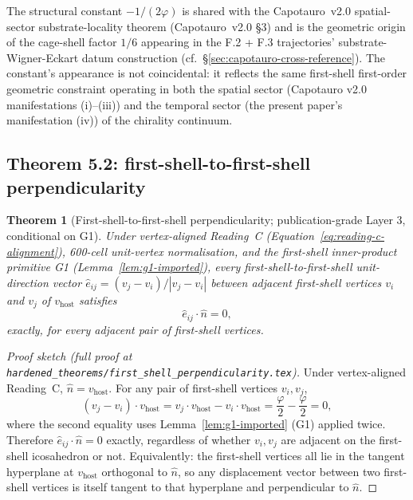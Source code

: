 \documentclass[11pt,letterpaper]{article}
\newtheorem{theorem}{Theorem}[section]
\newcommand{\phig}{\varphi}
\newcommand{\vhost}{v_{\text{host}}}
\begin{document}
The structural constant $-1/(2\phig)$ is shared with the Capotauro~v2.0 spatial-sector substrate-locality theorem (Capotauro~v2.0 \S3) and is the geometric origin of the cage-shell factor $1/6$ appearing in the F.2 + F.3 trajectories' substrate-Wigner-Eckart datum construction (cf.\ \S\ref{sec:capotauro-cross-reference}). The constant's appearance is not coincidental: it reflects the same first-shell first-order geometric constraint operating in both the spatial sector (Capotauro v2.0 manifestations (i)--(iii)) and the temporal sector (the present paper's manifestation (iv)) of the chirality continuum.

\subsection{Theorem 5.2: first-shell-to-first-shell perpendicularity}
\label{sec:first-shell-perpendicularity}

\begin{theorem}[First-shell-to-first-shell perpendicularity; publication-grade Layer 3, conditional on G1]
\label{thm:first-shell-perpendicularity}
Under vertex-aligned Reading~C (Equation~\eqref{eq:reading-c-alignment}), 600-cell unit-vertex normalisation, and the first-shell inner-product primitive G1 (Lemma~\ref{lem:g1-imported}), every first-shell-to-first-shell unit-direction vector $\hat{e}_{ij} = (v_j - v_i) / |v_j - v_i|$ between adjacent first-shell vertices $v_i$ and $v_j$ of $\vhost$ satisfies
\begin{equation}
\hat{e}_{ij} \cdot \hat{n} = 0,
\label{eq:first-shell-perpendicularity}
\end{equation}
exactly, for every adjacent pair of first-shell vertices.
\end{theorem}

\begin{proof}[Proof sketch (full proof at \texttt{hardened\_theorems/first\_shell\_perpendicularity.tex})]
Under vertex-aligned Reading~C, $\hat{n} = \vhost$. For any pair of first-shell vertices $v_i, v_j$,
\[
(v_j - v_i) \cdot \vhost = v_j \cdot \vhost - v_i \cdot \vhost = \frac{\phig}{2} - \frac{\phig}{2} = 0,
\]
where the second equality uses Lemma~\ref{lem:g1-imported} (G1) applied twice. Therefore $\hat{e}_{ij} \cdot \hat{n} = 0$ exactly, regardless of whether $v_i, v_j$ are adjacent on the first-shell icosahedron or not. Equivalently: the first-shell vertices all lie in the tangent hyperplane at $\vhost$ orthogonal to $\hat{n}$, so any displacement vector between two first-shell vertices is itself tangent to that hyperplane and perpendicular to $\hat{n}$.
\end{proof}
\end{document}
